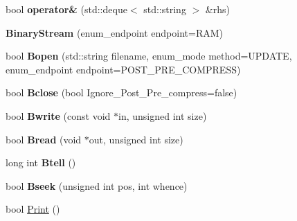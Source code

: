 \begin{DoxyCompactItemize}
\item 
\hypertarget{classBinaryStream_a80b6b47ffd83d312c343556b9c52f0b8}{bool {\bfseries operator\&} (std\-::deque$<$ std\-::string $>$ \&rhs)}\label{classBinaryStream_a80b6b47ffd83d312c343556b9c52f0b8}

\item 
\hypertarget{classBinaryStream_af65088798a6f0808f30f906e59902007}{{\bfseries Binary\-Stream} (enum\-\_\-endpoint endpoint=R\-A\-M)}\label{classBinaryStream_af65088798a6f0808f30f906e59902007}

\item 
\hypertarget{classBinaryStream_a275275e82cf87833f1f1b053d65774f2}{bool {\bfseries Bopen} (std\-::string filename, enum\-\_\-mode method=U\-P\-D\-A\-T\-E, enum\-\_\-endpoint endpoint=P\-O\-S\-T\-\_\-\-P\-R\-E\-\_\-\-C\-O\-M\-P\-R\-E\-S\-S)}\label{classBinaryStream_a275275e82cf87833f1f1b053d65774f2}

\item 
\hypertarget{classBinaryStream_a05975e038070b0fc7796c807bf42813d}{bool {\bfseries Bclose} (bool Ignore\-\_\-\-Post\-\_\-\-Pre\-\_\-compress=false)}\label{classBinaryStream_a05975e038070b0fc7796c807bf42813d}

\item 
\hypertarget{classBinaryStream_a7fde80b6a974f1eb31e89fb5b36a90ab}{bool {\bfseries Bwrite} (const void $\ast$in, unsigned int size)}\label{classBinaryStream_a7fde80b6a974f1eb31e89fb5b36a90ab}

\item 
\hypertarget{classBinaryStream_aed80ea557babddcc56c6b22ad58cbd3b}{bool {\bfseries Bread} (void $\ast$out, unsigned int size)}\label{classBinaryStream_aed80ea557babddcc56c6b22ad58cbd3b}

\item 
\hypertarget{classBinaryStream_ae2074057343fbfadb32ef74a444bf226}{long int {\bfseries Btell} ()}\label{classBinaryStream_ae2074057343fbfadb32ef74a444bf226}

\item 
\hypertarget{classBinaryStream_a9f4620b1b7d964bd4ef41bf7afbc7c84}{bool {\bfseries Bseek} (unsigned int pos, int whence)}\label{classBinaryStream_a9f4620b1b7d964bd4ef41bf7afbc7c84}

\item 
\hypertarget{classBinaryStream_a87160fadec72bf15857bd995134b2109}{bool \hyperlink{classBinaryStream_a87160fadec72bf15857bd995134b2109}{Print} ()}\label{classBinaryStream_a87160fadec72bf15857bd995134b2109}


\end{DoxyCompactItemize}
